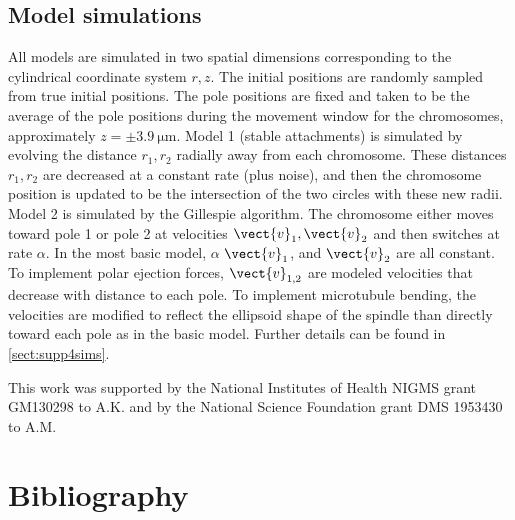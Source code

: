 \documentclass[times, twoside,onecolumn]{zHenriquesLab-StyleBioRxiv}
\begin{document}
{\subsection*{Model simulations} All models are simulated in two spatial dimensions corresponding to the cylindrical coordinate system $r,z$. The initial positions are randomly sampled from true initial positions. The pole positions are fixed and taken to be the average of the pole positions during the movement window for the chromosomes, approximately $z=\pm\SI{3.9}{\um}$. Model 1 (stable attachments) is simulated by evolving the distance $r_1, r_2$ radially away from each chromosome. These distances $r_1, r_2$ are decreased at a constant rate (plus noise), and then the chromosome position is updated to be the intersection of the two circles with these new radii.  Model 2 is simulated by the Gillespie algorithm. The chromosome either moves toward pole 1 or pole 2 at velocities $\vect{v}_1, \vect{v}_2$ and then switches at rate $\alpha$. In the most basic model, $\alpha$  $\vect{v}_1$, and $\vect{v}_2$ are all constant. To implement polar ejection forces, $\vect{v}_{1,2}$ are modeled velocities that decrease with distance to each pole. To implement microtubule bending, the velocities are modified to reflect the ellipsoid shape of the spindle than directly toward each pole as in the basic model.  Further details can be found  in \cref{sect:supp4sims}. 

\mbox{}}


\begin{acknowledgements} This work was supported by the National Institutes of Health 
NIGMS grant GM130298 to A.K. and by the National Science Foundation grant DMS 1953430
to A.M.
\end{acknowledgements}

\section*{Bibliography}


\clearpage

\onecolumn
\newpage


\clearpage 

\setcounter{equation}{0}
\setcounter{figure}{0}
\setcounter{table}{0}
\setcounter{page}{1}
\makeatletter
\renewcommand{\theequation}{S\arabic{equation}}
\renewcommand{\thefigure}{S\arabic{figure}}
\end{document}
